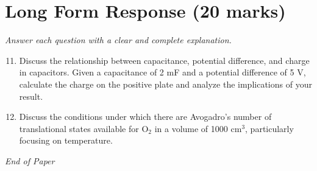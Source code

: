 \documentclass[12pt]{article}
\begin{document}
\section*{Long Form Response (20 marks)}
\textit{Answer each question with a clear and complete explanation.}
\begin{enumerate}[label=\arabic*.]
\setcounter{enumi}{10}
\item Discuss the relationship between capacitance, potential difference, and charge in capacitors. Given a capacitance of 2 mF and a potential difference of 5 V, calculate the charge on the positive plate and analyze the implications of your result.
\item Discuss the conditions under which there are Avogadro's number of translational states available for $\mathrm{O}_2$ in a volume of 1000 $\mathrm{cm}^3$, particularly focusing on temperature.
\end{enumerate}

\vfill
\noindent\textit{End of Paper}
\end{document}
